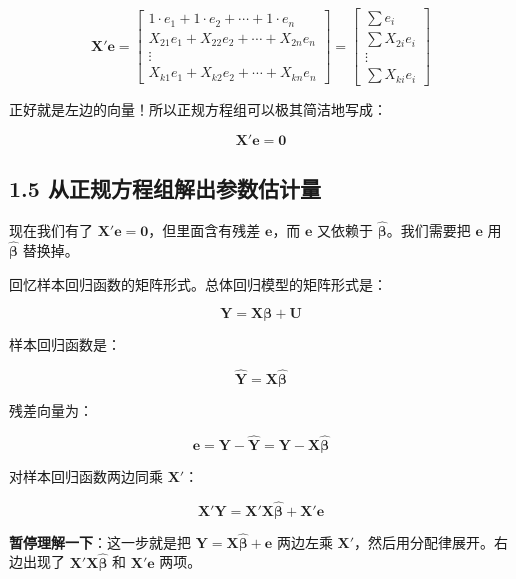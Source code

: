 \documentclass[12pt,a4paper]{ctexart}
\begin{document}
\[
\mathbf{X}'\mathbf{e} =
\begin{bmatrix}
1 \cdot e_1 + 1 \cdot e_2 + \cdots + 1 \cdot e_n \\
X_{21} e_1 + X_{22} e_2 + \cdots + X_{2n} e_n \\
\vdots \\
X_{k1} e_1 + X_{k2} e_2 + \cdots + X_{kn} e_n
\end{bmatrix}
=
\begin{bmatrix}
\sum e_i \\
\sum X_{2i} e_i \\
\vdots \\
\sum X_{ki} e_i
\end{bmatrix}
\]

正好就是左边的向量！所以正规方程组可以极其简洁地写成：

\begin{equation}
\mathbf{X}'\mathbf{e} = \mathbf{0} \tag{3.23}
\end{equation}

\subsection{1.5 从正规方程组解出参数估计量}

现在我们有了 $\mathbf{X}'\mathbf{e} = \mathbf{0}$，但里面含有残差 $\mathbf{e}$，而 $\mathbf{e}$ 又依赖于 $\hat{\boldsymbol{\beta}}$。我们需要把 $\mathbf{e}$ 用 $\hat{\boldsymbol{\beta}}$ 替换掉。

回忆样本回归函数的矩阵形式。总体回归模型的矩阵形式是：

\[
\mathbf{Y} = \mathbf{X}\boldsymbol{\beta} + \mathbf{U}
\]

样本回归函数是：

\[
\hat{\mathbf{Y}} = \mathbf{X}\hat{\boldsymbol{\beta}}
\]

残差向量为：

\[
\mathbf{e} = \mathbf{Y} - \hat{\mathbf{Y}} = \mathbf{Y} - \mathbf{X}\hat{\boldsymbol{\beta}}
\]

对样本回归函数两边同乘 $\mathbf{X}'$：

\begin{equation}
\mathbf{X}'\mathbf{Y} = \mathbf{X}'\mathbf{X}\hat{\boldsymbol{\beta}} + \mathbf{X}'\mathbf{e} \tag{3.24}
\end{equation}

\textbf{暂停理解一下}：这一步就是把 $\mathbf{Y} = \mathbf{X}\hat{\boldsymbol{\beta}} + \mathbf{e}$ 两边左乘 $\mathbf{X}'$，然后用分配律展开。右边出现了 $\mathbf{X}'\mathbf{X}\hat{\boldsymbol{\beta}}$ 和 $\mathbf{X}'\mathbf{e}$ 两项。
\end{document}
